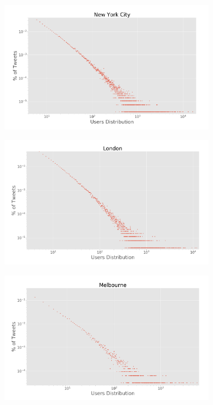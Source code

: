 \begin{figure}[h]
	\begin{subfigure}[t]{0.45\textwidth}
		\centering
		\includegraphics[width=1\linewidth]{figures/nyc_loglog_users.png}
		\caption{}
		\label{subfig:newyork_loglog_users}
	\end{subfigure}
	\quad
	\begin{subfigure}[t]{0.45\textwidth}
		\centering
		\includegraphics[width=1\linewidth]{figures/london_loglog_users.png}
		\caption{}
		\label{subfig:london_loglog_users}
	\end{subfigure}
	
	\medskip
	
	\begin{subfigure}[t]{0.45\textwidth}
		\centering
		\includegraphics[width=1\linewidth]{figures/melbourne_loglog_users.png}
		\caption{}
		\label{subfig:melbourne_loglog_users}
	\end{subfigure}
	

\end{figure}
